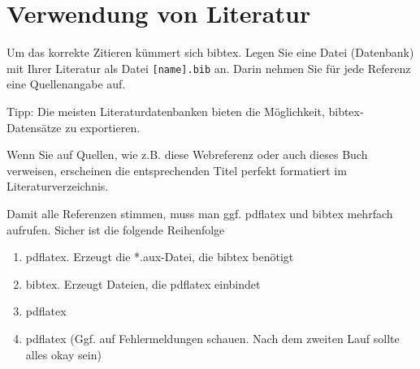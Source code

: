 \newpage

\section{Verwendung von Literatur}

Um das korrekte Zitieren kümmert sich bibtex. Legen Sie eine Datei (Datenbank) mit Ihrer Literatur als Datei \verb+[name].bib+ an. Darin nehmen Sie für jede Referenz eine Quellenangabe auf.

Tipp: Die meisten Literaturdatenbanken bieten die Möglichkeit, bibtex-Datensätze zu exportieren.

Wenn Sie auf Quellen, wie z.B. diese Webreferenz \cite{web} oder auch dieses Buch \cite{book} verweisen, erscheinen die entsprechenden Titel perfekt formatiert im Literaturverzeichnis.

Damit alle Referenzen stimmen, muss man ggf. pdflatex und bibtex mehrfach aufrufen. Sicher ist die folgende Reihenfolge
\begin{enumerate}
\item pdflatex. Erzeugt die *.aux-Datei, die bibtex benötigt
\item bibtex. Erzeugt Dateien, die pdflatex einbindet
\item pdflatex
\item pdflatex (Ggf. auf Fehlermeldungen schauen. Nach dem zweiten Lauf sollte alles okay sein)
\end{enumerate}
